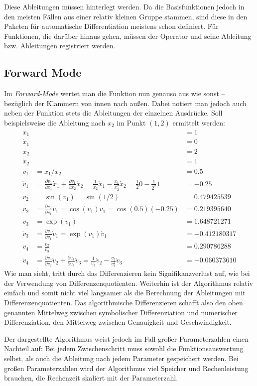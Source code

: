 \documentclass{scrartcl}
\begin{document}
Diese Ableitungen müssen hinterlegt werden. Da die Basisfunktionen jedoch in den meisten Fällen aus einer relativ kleinen Gruppe stammen, sind diese in den Paketen für automatische Differentiation meistens schon definiert. Für Funktionen, die darüber hinaus gehen, müssen der Operator und seine Ableitung bzw. Ableitungen registriert werden.
\subsection{Forward Mode}

Im \emph{Forward-Mode} wertet man die Funktion nun genauso aus wie sonst -- bezüglich der Klammern von innen nach außen. Dabei notiert man jedoch auch neben der Funktion stets die Ableitungen der einzelnen Ausdrücke. Soll beispielsweise die Ableitung nach $x_2$ im Punkt $(1,2)$ ermittelt werden:
\begin{equation*}
\begin{aligned}
	x_1 &&= 1\\
	\dot{x}_1 &&= 0\\[0.3cm]
	x_2 &&= 2\\
	\dot{x}_2 &&= 1\\[0.3cm]
	v_1 &= x_1/x_2 &= \num{0,5} \\
	\dot{v}_1 &= \tfrac{\partial v_1}{\partial x_1}\dot{x}_1 + \tfrac{\partial v_1}{\partial x_2}\dot{x}_2 = \tfrac{1}{x_2}\dot{x}_1 - \tfrac{x_1}{x_2^2}\dot{x}_2 = \tfrac{1}{2}0 - \tfrac{1}{2^2}1 &= \num{-0,25}\\[0.3cm]
	v_2 &= \sin(v_1) = \sin(1/2) &= \num{0.479425539}\\
	\dot{v}_2 &= \tfrac{\partial v_2}{\partial v_1}\dot{v}_1 = \cos(v_1)\dot v_1 = \cos(\num{0,5})(-\num{0,25}) &= \num{0.219395640}\\[0.3cm]
	v_3 &= \exp(v_1) &= \num{1.648721271}\\
	\dot v_3 &= \tfrac{\partial v_3}{\partial v_1}\dot v_1 = \exp(v_1)\dot v_1 &= \num{-0.412180317} \\[0.3cm]
	v_4 &= \tfrac{v_2}{v_3} &= \num{0.290786288} \\
	\dot v_4 &= \tfrac{\partial v_4}{\partial v_2} \dot v_2 + \tfrac{\partial v_4}{\partial v_3}\dot v_3 = \tfrac{1}{v_3}\dot v_2 - \tfrac{v_2}{v_3^2}\dot v_3 &= \num{-0.060373610}
\end{aligned}
\end{equation*}
Wie man sieht, tritt durch das Differenzieren kein Signifikanzverlust auf, wie bei der Verwendung von Differenzenquotienten. Weiterhin ist der Algorithmus relativ einfach und somit nicht viel langsamer als die Berechnung der Ableitungen mit Differenzenquotienten. Das algorithmische Differenzieren schafft also den oben genannten Mittelweg zwischen symbolischer Differenziation und numerischer Differenziation, den Mittelweg zwischen Genauigkeit und Geschwindigkeit.\par
Der dargestellte Algorithmus weist jedoch im Fall großer Parameterzahlen einen Nachteil auf: Bei jedem Zwischenschritt muss sowohl die Funktionsauswertung selbst, als auch die Ableitung nach jedem Parameter gespeichert werden. Bei großen Parameterzahlen wird der Algorithmus viel Speicher und Rechenleistung brauchen, die Rechenzeit skaliert mit der Parameterzahl.
\end{document}
